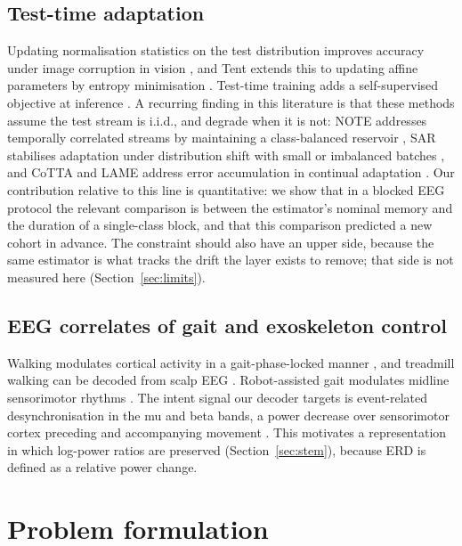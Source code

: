 \documentclass[a4paper,fleqn]{cas-dc}
\begin{document}
\subsection{Test-time adaptation}

Updating normalisation statistics on the test distribution improves accuracy
under image corruption in vision \citep{schneider,nado}, and Tent extends this to
updating affine parameters by entropy minimisation \citep{tent}. Test-time
training adds a self-supervised objective at inference \citep{ttt}. A recurring
finding in this literature is that these methods assume the test stream is
i.i.d., and degrade when it is not: NOTE addresses temporally correlated streams
by maintaining a class-balanced reservoir \citep{note}, SAR stabilises
adaptation under distribution shift with small or imbalanced batches
\citep{sar}, and CoTTA and LAME address error accumulation in continual
adaptation \citep{cotta,lame}. Our contribution relative to this line is
quantitative: we show that in a blocked EEG protocol the
relevant comparison is between the estimator's nominal memory and the
duration of a single-class block, and that this comparison predicted a new
cohort in advance. The constraint should also have an upper side, because the
same estimator is what tracks the drift the layer exists to remove; that side
is not measured here (Section~\ref{sec:limits}).

\subsection{EEG correlates of gait and exoskeleton control}

Walking modulates cortical activity in a gait-phase-locked manner
\citep{gwin,seeber}, and treadmill walking can be decoded from scalp EEG
\citep{presacco,luu}. Robot-assisted gait modulates midline sensorimotor rhythms
\citep{wagner}. The intent signal our decoder targets is event-related
desynchronisation in the mu and beta bands, a power decrease over sensorimotor
cortex preceding and accompanying movement \citep{erd,pfurtscheller2006}. This
motivates a representation in which log-power ratios are preserved
(Section~\ref{sec:stem}), because ERD is defined as a relative power change.

\section{Problem formulation}
\end{document}
